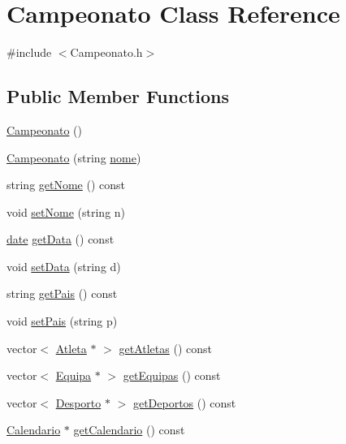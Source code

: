 \hypertarget{class_campeonato}{}\section{Campeonato Class Reference}
\label{class_campeonato}


{\ttfamily \#include $<$Campeonato.\+h$>$}

\subsection*{Public Member Functions}
\begin{DoxyCompactItemize}
\item 
\hyperlink{class_campeonato_aa14214a5863681b19922ad1515a3d14b}{Campeonato} ()
\item 
\hyperlink{class_campeonato_a6cdd161a2ea5ffd62810e8bfd4a4dc6c}{Campeonato} (string \hyperlink{class_campeonato_a670b0857b7a8bc3c5dbf0f927ee192fe}{nome})
\item 
string \hyperlink{class_campeonato_ae014ca753715e808b6d67c73f241f27d}{get\+Nome} () const 
\item 
void \hyperlink{class_campeonato_ab2654ae701c2418dab5c70aa4cd74b57}{set\+Nome} (string n)
\item 
\hyperlink{structdate}{date} \hyperlink{class_campeonato_ab78957e0803c30d318455d3d2b4f843b}{get\+Data} () const 
\item 
void \hyperlink{class_campeonato_a27bda42e9ca401475e70f5ab64bfc97a}{set\+Data} (string d)
\item 
string \hyperlink{class_campeonato_a152f1d8474275af981214ed24663bf3f}{get\+Pais} () const 
\item 
void \hyperlink{class_campeonato_a93bfc1733ef03cc4f0a71619f6f25701}{set\+Pais} (string p)
\item 
vector$<$ \hyperlink{class_atleta}{Atleta} $\ast$ $>$ \hyperlink{class_campeonato_ab37dc7253ffed81cc81e90c569d83cf9}{get\+Atletas} () const 
\item 
vector$<$ \hyperlink{class_equipa}{Equipa} $\ast$ $>$ \hyperlink{class_campeonato_ac82ee7c13b116b71525cff9f557b45c2}{get\+Equipas} () const 
\item 
vector$<$ \hyperlink{class_desporto}{Desporto} $\ast$ $>$ \hyperlink{class_campeonato_aa07da18865320276e7ea4506cc81d8fe}{get\+Deportos} () const 
\item 
\hyperlink{class_calendario}{Calendario} $\ast$ \hyperlink{class_campeonato_afb142b85e3413714cb1eecfc3e474f5c}{get\+Calendario} () const 

\end{DoxyCompactItemize}
